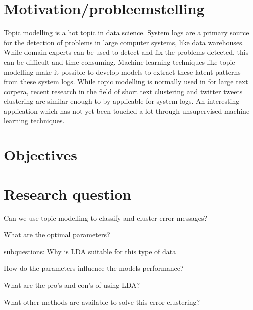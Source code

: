 \section{Motivation/probleemstelling}
Topic modelling is a hot topic in data science. 
System logs are a primary source for the detection of problems in large computer systems, like data warehouses. While domain experts can be used to detect and fix the problems detected, this can be difficult and time consuming. Machine learning techniques like topic modelling make it possible to develop models to extract these latent patterns from these system logs. While topic modelling is normally used in for large text corpera, recent research in the field of short text clustering and twitter tweets clustering are similar enough to by applicable for system logs. An interesting application which has not yet been touched a lot through unsupervised machine learning techniques.

\section{Objectives}


\section{Research question}
Can we use topic modelling to classify and cluster error messages?

What are the optimal parameters?

subquestions:
Why is LDA suitable for this type of data 

How do the parameters influence the models performance?

What are the pro's and con's of using LDA?

What other methods are available to solve this error clustering?



